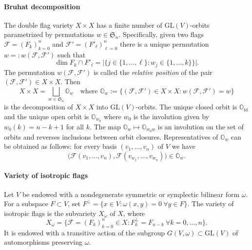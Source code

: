 \documentclass{amsart}
\theoremstyle{definition}
\begin{document}
\medskip

\paragraph{{\bf Bruhat decomposition}}
The double flag variety $X\times X$ has a finite number
of $\mathrm{GL}(V)$-orbits parametrized by permutations $w\in\mathfrak{S}_n$.
Specifically, given two flags $\mathcal{F}=(F_k)_{k=0}^n$ and
$\mathcal{F}'=(F'_\ell)_{\ell=0}^n$ there is a unique permutation
$w=:w(\mathcal{F},\mathcal{F}')$ such that
\[\dim F_k\cap F'_\ell=\big|\big\{j\in\{1,\ldots,\ell\}:w_j\in\{1,\ldots,k\}\big\}\big|.\]
The permutation $w(\mathcal{F},\mathcal{F}')$ is called the \emph{relative position} of the pair $(\mathcal{F},\mathcal{F}')\in X\times X$.
Then
\[X\times X=\bigsqcup_{w\in\mathfrak{S}_n}\mathbb{O}_w
\quad\mbox{where $\mathbb{O}_w:=\big\{(\mathcal{F},\mathcal{F}')\in X\times X:w(\mathcal{F},\mathcal{F}')=w\big\}$}\]
is the decomposition of $X\times X$ into $\mathrm{GL}(V)$-orbits.
The unique closed orbit is $\mathbb{O}_{\mathrm{id}}$ and the unique open
orbit is $\mathbb{O}_{w_0}$ where $w_0$ is the involution given by
$w_0(k)=n-k+1$ for all $k$. The map
$\mathbb{O}_w\mapsto\mathbb{O}_{w_0w}$ is an involution on the set
of orbits and reverses inclusions between orbit closures.
Representatives of $\mathbb{O}_w$ can be obtained as follows:
for every basis $(v_1,\ldots,v_n)$ of $V$ we have
\[\big(\mathcal{F}(v_1,\ldots,v_n),\mathcal{F}(v_{w_1},\ldots,v_{w_n})\big)\in\mathbb{O}_w.\]

\medskip

\paragraph{{\bf Variety of isotropic flags}} Let $V$ be endowed with a nondegenerate symmetric or symplectic bilinear form $\omega$. 
For a subspace $F\subset V$, set $F^\perp=\{x\in V:\omega(x,y)=0\ \forall y\in F\}$.
The variety of isotropic flags is the subvariety $X_\omega$ of $X$, where
\begin{equation}
\label{2.2.Xomega}
X_\omega=\{\mathcal{F}=(F_k)_{k=0}^n\in X:F_k^\perp=F_{n-k}\ \forall k=0,\ldots,n\}.
\end{equation}
It is endowed with a transitive action of the subgroup
$G(V,\omega)\subset\mathrm{GL}(V)$ of automorphisms preserving $\omega$. 
\end{document}
